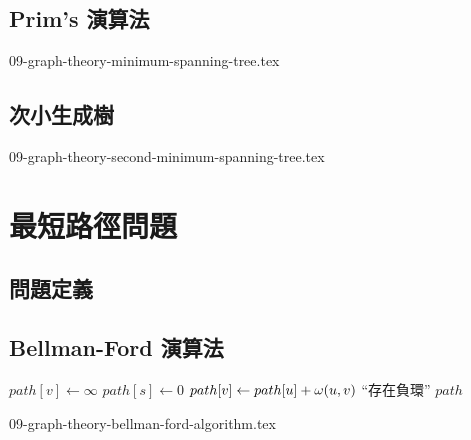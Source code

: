 \documentclass[12pt,a4paper,oneside]{report}
\begin{document}
\begin{CJK}{UTF8}{bkai}
\subsection{Prim's 演算法}

{09-graph-theory-minimum-spanning-tree.tex}

\subsection{次小生成樹}

{09-graph-theory-second-minimum-spanning-tree.tex}

\section{最短路徑問題}
\subsection{問題定義}
\subsection{Bellman-Ford 演算法}

\begin{algorithm}
\caption{Bellman-Ford 演算法}
\label{algo:shortest_path_bellman_ford}
\begin{algorithmic}[1]
  \State{}
    \State $path[v]\gets\infty$
  \EndFor
  \State $path[s]\gets{0}$
        \State $path[v]\gets{path[u]+\omega{\ensuremath{({u},{v})}}}$
      \EndIf
    \EndFor
  \EndFor
      \State \Return ``存在負環''
    \EndIf
  \EndFor
  \State \Return $path$
\EndProcedure
\end{algorithmic}
\end{algorithm}

{09-graph-theory-bellman-ford-algorithm.tex}


\end{CJK}
\end{document}
